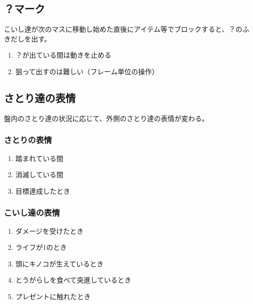 

\subsection{？\hspace{0pt}マーク}
こいし達が次のマスに移動し始めた直後にアイテム等でブロックすると、？\hspace{0pt}のふきだしを出す。
\begin{enumerate}[label={\sarrow}]
\item ？\hspace{0pt}が出ている間は動きを止める
\item 狙って出すのは難しい（フレーム単位の操作）
\end{enumerate}



\subsection{さとり達の表情}
盤内のさとり達の状況に応じて、外側のさとり達の表情が変わる。

\subsubsection{さとりの表情}
\begin{enumerate}[label={\sarrow}]
\item 踏まれている間
\item 消滅している間
\item 目標達成したとき
\end{enumerate}

\subsubsection{こいし達の表情}
\begin{enumerate}[label={\sarrow}]
\item ダメージを受けたとき
\item ライフが1のとき
\item 頭にキノコが生えているとき
\item とうがらしを食べて突進しているとき
\item プレゼントに触れたとき
\end{enumerate}


